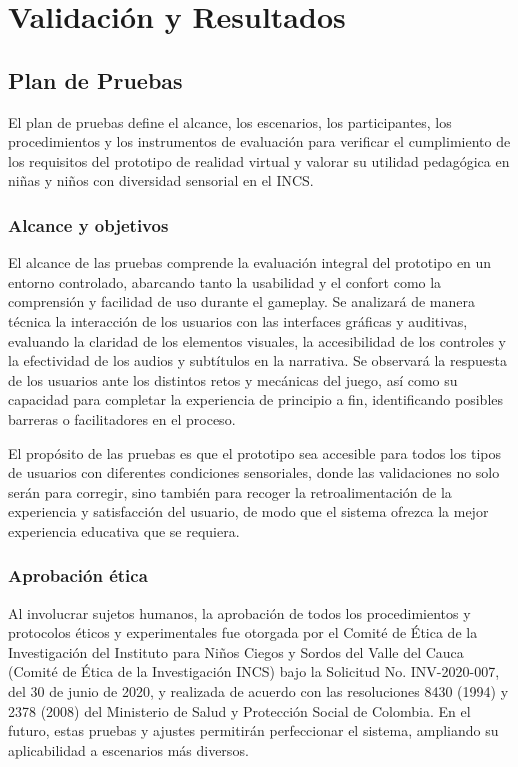 \chapter{Validación y Resultados}
\section{Plan de Pruebas}
El plan de pruebas define el alcance, los escenarios, los participantes, los procedimientos y los instrumentos de evaluación para verificar el cumplimiento de los requisitos del prototipo de realidad virtual y valorar su utilidad pedagógica en niñas y niños con diversidad sensorial en el INCS.

\subsection{Alcance y objetivos}
El alcance de las pruebas comprende la evaluación integral del prototipo en un entorno controlado, abarcando tanto la usabilidad y el confort como la comprensión y facilidad de uso durante el gameplay. Se analizará de manera técnica la interacción de los usuarios con las interfaces gráficas y auditivas, evaluando la claridad de los elementos visuales, la accesibilidad de los controles y la efectividad de los audios y subtítulos en la narrativa. Se observará la respuesta de los usuarios ante los distintos retos y mecánicas del juego, así como su capacidad para completar la experiencia de principio a fin, identificando posibles barreras o facilitadores en el proceso.

El propósito de las pruebas es que el prototipo sea accesible para todos los tipos de usuarios con diferentes condiciones sensoriales, donde las validaciones no solo serán para corregir, sino también para recoger la retroalimentación de la experiencia y satisfacción del usuario, de modo que el sistema ofrezca la mejor experiencia educativa que se requiera.

\subsection{Aprobación ética}
Al involucrar sujetos humanos, la aprobación de todos los procedimientos y protocolos éticos y experimentales fue otorgada por el Comité de Ética de la Investigación del Instituto para Niños Ciegos y Sordos del Valle del Cauca (Comité de Ética de la Investigación INCS) bajo la Solicitud No. INV-2020-007, del 30 de junio de 2020, y realizada de acuerdo con las resoluciones 8430 (1994) y 2378 (2008) del Ministerio de Salud y Protección Social de Colombia. En el futuro, estas pruebas y ajustes permitirán perfeccionar el sistema, ampliando su aplicabilidad a escenarios más diversos.

